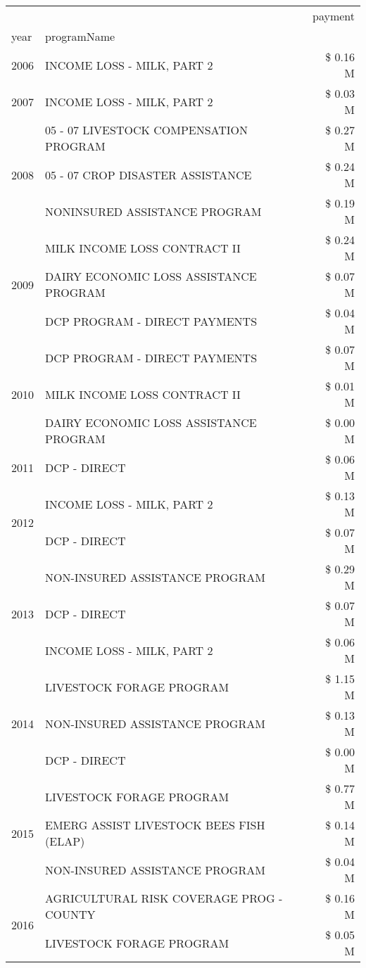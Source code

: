 \begin{tabular}{llr}
\toprule
 &  & payment \\
year & programName &  \\
\midrule
2006 & INCOME LOSS - MILK, PART 2 & \$ 0.16 M \\
\cline{1-3}
2007 & INCOME LOSS - MILK, PART 2 & \$ 0.03 M \\
\cline{1-3}
\multirow[t]{3}{*}{2008} & 05 - 07 LIVESTOCK COMPENSATION PROGRAM & \$ 0.27 M \\
 & 05 - 07 CROP DISASTER ASSISTANCE & \$ 0.24 M \\
 & NONINSURED ASSISTANCE PROGRAM & \$ 0.19 M \\
\cline{1-3}
\multirow[t]{3}{*}{2009} & MILK INCOME LOSS CONTRACT II & \$ 0.24 M \\
 & DAIRY ECONOMIC LOSS ASSISTANCE PROGRAM & \$ 0.07 M \\
 & DCP PROGRAM - DIRECT PAYMENTS & \$ 0.04 M \\
\cline{1-3}
\multirow[t]{3}{*}{2010} & DCP PROGRAM - DIRECT PAYMENTS & \$ 0.07 M \\
 & MILK INCOME LOSS CONTRACT II & \$ 0.01 M \\
 & DAIRY ECONOMIC LOSS ASSISTANCE PROGRAM & \$ 0.00 M \\
\cline{1-3}
2011 & DCP - DIRECT & \$ 0.06 M \\
\cline{1-3}
\multirow[t]{2}{*}{2012} & INCOME LOSS - MILK, PART 2 & \$ 0.13 M \\
 & DCP - DIRECT & \$ 0.07 M \\
\cline{1-3}
\multirow[t]{3}{*}{2013} & NON-INSURED ASSISTANCE PROGRAM & \$ 0.29 M \\
 & DCP - DIRECT & \$ 0.07 M \\
 & INCOME LOSS - MILK, PART 2 & \$ 0.06 M \\
\cline{1-3}
\multirow[t]{3}{*}{2014} & LIVESTOCK FORAGE PROGRAM & \$ 1.15 M \\
 & NON-INSURED ASSISTANCE PROGRAM & \$ 0.13 M \\
 & DCP - DIRECT & \$ 0.00 M \\
\cline{1-3}
\multirow[t]{3}{*}{2015} & LIVESTOCK FORAGE PROGRAM & \$ 0.77 M \\
 & EMERG ASSIST LIVESTOCK BEES FISH (ELAP) & \$ 0.14 M \\
 & NON-INSURED ASSISTANCE PROGRAM & \$ 0.04 M \\
\cline{1-3}
\multirow[t]{3}{*}{2016} & AGRICULTURAL RISK COVERAGE PROG - COUNTY & \$ 0.16 M \\
 & LIVESTOCK FORAGE PROGRAM & \$ 0.05 M \\

\end{tabular}
